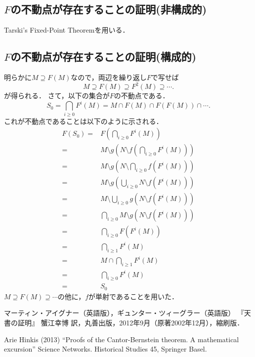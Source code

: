 \documentclass[lualatex, ja=standard, a4paper]{bxjsarticle}
\newcommand{\tp}[2]{\texorpdfstring{#1}{#2}}
\begin{document}
    \subsection{\tp{$F$}{F}の不動点が存在することの証明(非構成的)}
    Tarski's Fixed-Point Theoremを用いる．

    \subsection{\tp{$F$}{F}の不動点が存在することの証明(構成的)}
    明らかに$M \supseteq F(M)$なので，両辺を繰り返し$F$で写せば
    \[ M \supseteq F(M) \supseteq F^2(M) \supseteq \cdots. \]
    が得られる．
    さて，以下の集合が$F$の不動点である．
    \[ S_0=\bigcap_{i \geq 0}{F^{i}(M)}=M \cap F(M) \cap F(F(M)) \cap \cdots. \]
    これが不動点であることは以下のように示される．
    \begin{align*}
    F(S_0)
    =&F \left(\bigcap_{i \geq 0}{F^{i}(M)} \right) \\
    =&M \setminus g \left(N \setminus f \left(\bigcap_{i \geq 0}{F^{i}(M)} \right) \right) \\
    =&M \setminus g \left(N \setminus \bigcap_{i \geq 0}{f(F^{i}(M))} \right)\\
    =&M \setminus g \left(\bigcup_{i \geq 0}{N \setminus f(F^{i}(M))} \right)\\
    =&M \setminus \bigcup_{i \geq 0}{g(N \setminus f(F^{i}(M)))}\\
    =& \bigcap_{i \geq 0}{M \setminus g(N \setminus f(F^{i}(M)))}\\
    =& \bigcap_{i \geq 0}{F(F^{i}(M))} \\
    =& \bigcap_{i \geq 1}{F^{i}(M)} \\
    =& M \cap \bigcap_{i \geq 1}{F^{i}(M)} \\
    =& \bigcap_{i \geq 0}{F^{i}(M)} \\
    =& S_0
    \end{align*}
    $M \supseteq F(M) \supseteq \cdots$の他に，$f$が単射であることを用いた．

    \begin{thebibliography}{99}
            マーティン・アイグナー（英語版），ギュンター・ツィーグラー（英語版）
            『天書の証明』 蟹江幸博 訳，丸善出版，2012年9月（原著2002年12月），縮刷版．

        Arie Hinkis (2013) 
        ``Proofs of the Cantor-Bernstein theorem. A mathematical excursion''
        Science Networks. Historical Studies 45, Springer Basel.
    \end{thebibliography}
\end{document}
